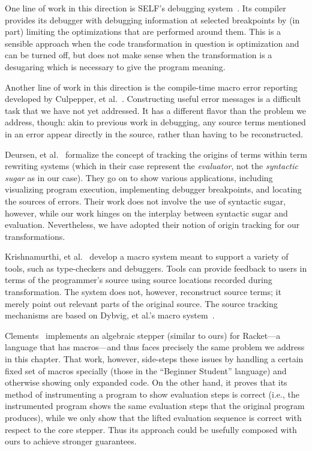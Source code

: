 One line of work in this direction is SELF's debugging
system~\cite{self-debugging}. Its compiler provides its debugger with
debugging information at selected breakpoints by (in part) limiting the
optimizations that are performed around them. This is a sensible approach
when the code transformation in question is optimization and can be turned
off, but does not make sense when the transformation is a desugaring
which is necessary to give the program meaning.

Another line of work in this direction is the compile-time macro error
reporting developed by Culpepper, et al.~\cite{fortifying-macros}.
Constructing useful error messages is a difficult task that we have not
yet addressed. It has a different flavor than the problem we address,
though: akin to previous work in debugging, any source terms mentioned in
an error appear directly in the source, rather than having to be
reconstructed.

Deursen, et al.~\cite{deursen:origin-tracking} formalize the concept of
tracking the origins
of terms within term rewriting systems (which in their case represent
the \emph{evaluator}, not the \emph{syntactic sugar} as in our
case). They go on to show various applications, including
visualizing program execution, implementing debugger breakpoints,
and locating the sources of errors.
Their work does not involve the use of syntactic sugar,
however, while our work hinges on the interplay between syntactic
sugar and evaluation. Nevertheless, we
have adopted their notion of origin tracking for our transformations.

Krishnamurthi, et al.~\cite{sk:mcmicmac} develop a macro system meant
to support a variety of tools, such as type-checkers and
debuggers. Tools can provide feedback to users in terms of the
programmer's source using source locations recorded during
transformation. The system does not, however, reconstruct source
terms; it merely point out relevant parts of the original source.  The
source tracking mechanisms are based on Dybvig, et al.'s macro
system~\cite{expansion-passing-style}.

Clements~\cite[page 53]{clements:thesis} implements an algebraic
stepper (similar to ours) for Racket---a language that has
macros---and thus faces precisely the same problem we address in this
chapter. That work, however, side-steps these issues by handling a
certain fixed set of macros specially (those in the ``Beginner
Student'' language) and otherwise showing only expanded code.
On the other hand, it proves that its method of instrumenting a program to
show evaluation steps is correct (i.e., the instrumented program shows the
same evaluation steps that the original program produces),
while we only show that the lifted evaluation sequence is correct
with respect to the core stepper. Thus its approach could be
usefully composed with ours to achieve stronger guarantees.

